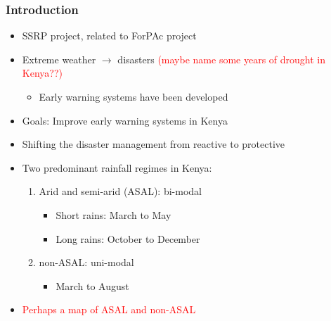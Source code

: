 \documentclass{beamer}              %
\begin{document}
\begin{frame}\label{Introduction}
\frametitle{Introduction} 
 \begin{itemize}
\item SSRP project, related to ForPAc project
\item Extreme weather $\rightarrow$ disasters \textcolor{red}{(maybe name some years of drought in Kenya??)}

\begin{itemize}
\item Early warning systems have been developed
\end{itemize}
\item Goals: Improve early warning systems in Kenya
\item Shifting the disaster management from reactive to protective
\end{itemize} 

\begin{itemize}
\item Two predominant rainfall regimes in Kenya:

\begin{enumerate}
\item Arid and semi-arid (ASAL): bi-modal
	\begin{itemize}
	\item Short rains: March to May
	\item Long rains: October to December
	\end{itemize}
\item non-ASAL: uni-modal
	\begin{itemize}
	\item March to August
	\end{itemize}

\end{enumerate}
\item \textcolor{red}{Perhaps a map of ASAL and non-ASAL}

\end{itemize}
\end{frame}


\end{document}

